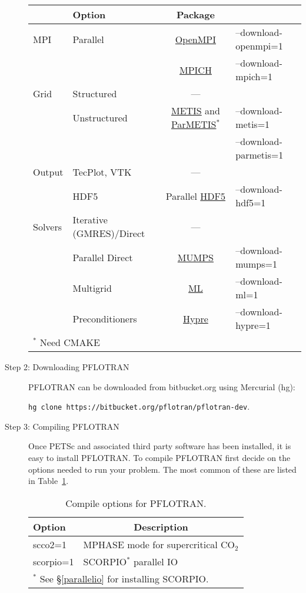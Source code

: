 \begin{description}
\begin{table}[H]
\begin{tabular}{llcl}
\toprule
& Option & Package\\
\midrule
MPI & Parallel & \href{http://www.open-mpi.org/}{OpenMPI} & --download-openmpi=1\\
&& \href{http://www.mpich.org/}{MPICH} &--download-mpich=1\\
\midrule
Grid & Structured & ---\\
& Unstructured & \href{http://glaros.dtc.umn.edu/gkhome/views/metis}{METIS} and \href{http://glaros.dtc.umn.edu/gkhome/views/metis}{ParMETIS}$^*$ & --download-metis=1\\
&&& --download-parmetis=1\\
\midrule
Output & TecPlot, VTK & ---\\
& HDF5 & Parallel \href{http://www.hdfgroup.org/HDF5/}{HDF5} & --download-hdf5=1\\
\midrule
Solvers & Iterative (GMRES)/Direct & ---\\
& Parallel Direct & \href{http://graal.ens-lyon.fr/MUMPS/}{MUMPS} & --download-mumps=1\\
& Multigrid & \href{http://trilinos.sandia.gov/packages/ml/}{ML} & --download-ml=1\\
& Preconditioners & \href{http://acts.nersc.gov/hypre/}{Hypre} & --download-hypre=1\\
\bottomrule
\multicolumn{2}{l}{$^*$ Need CMAKE}
\end{tabular}
\end{table}

\item[Step 2: Downloading PFLOTRAN] PFLOTRAN can be downloaded from bitbucket.org using Mercurial (hg):

{\footnotesize\tt hg clone https://bitbucket.org/pflotran/pflotran-dev}.

\item[Step 3: Compiling PFLOTRAN] Once PETSc and associated third party software has been installed, it is easy to install PFLOTRAN. To compile PFLOTRAN first decide on the options needed to run your problem. The most common of these are listed in Table~\ref{topt}.

\begin{table}[H]\centering
\caption{Compile options for PFLOTRAN.}

\vspace{3mm}

\label{topt}
\begin{tabular}{ll}
\toprule
Option & \multicolumn{1}{c}{Description}\\
\midrule
scco2=1 & MPHASE mode for supercritical CO$_2$\\
scorpio=1 & SCORPIO$^{*}$ parallel IO\\
\bottomrule
\multicolumn{2}{l}{$^{*}$ See \S\ref{parallelio} for installing SCORPIO.}
\end{tabular}


\end{table}
\end{description}
